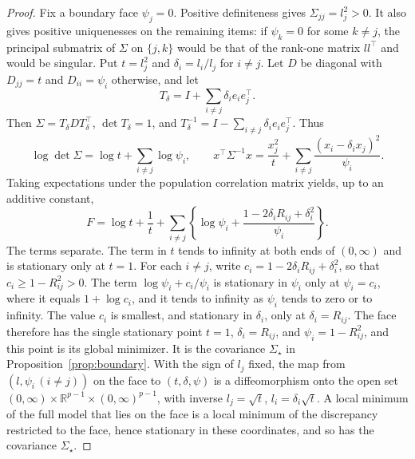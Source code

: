\begin{proof}
Fix a boundary face $\psi_j=0$. Positive definiteness gives $\Sigma_{jj}=l_j^2>0$. It also gives positive uniquenesses on the remaining items: if $\psi_k=0$ for some $k\ne j$, the principal submatrix of $\Sigma$ on $\{j,k\}$ would be that of the rank-one matrix $ll^{\top}$ and would be singular. Put $t=l_j^2$ and $\delta_i=l_i/l_j$ for $i\ne j$. Let $D$ be diagonal with $D_{jj}=t$ and $D_{ii}=\psi_i$ otherwise, and let
\[
T_\delta=I+\sum_{i\ne j}\delta_i e_i e_j^{\top}.
\]
Then $\Sigma=T_\delta DT_\delta^{\top}$, $\det T_\delta=1$, and $T_\delta^{-1}=I-\sum_{i\ne j}\delta_i e_i e_j^{\top}$. Thus
\[
\log\det\Sigma=\log t+\sum_{i\ne j}\log\psi_i,
\qquad
x^{\top}\Sigma^{-1}x
=\frac{x_j^2}{t}+\sum_{i\ne j}\frac{(x_i-\delta_i x_j)^2}{\psi_i}.
\]
Taking expectations under the population correlation matrix yields, up to an additive constant,
\[
F=\log t+\frac1t
+\sum_{i\ne j}\left\{\log\psi_i+
\frac{1-2\delta_iR_{ij}+\delta_i^2}{\psi_i}\right\}.
\]
The terms separate. The term in $t$ tends to infinity at both ends of $(0,\infty)$ and is stationary only at $t=1$. For each $i\ne j$, write $c_i=1-2\delta_iR_{ij}+\delta_i^2$, so that $c_i\ge1-R_{ij}^2>0$. The term $\log\psi_i+c_i/\psi_i$ is stationary in $\psi_i$ only at $\psi_i=c_i$, where it equals $1+\log c_i$, and it tends to infinity as $\psi_i$ tends to zero or to infinity. The value $c_i$ is smallest, and stationary in $\delta_i$, only at $\delta_i=R_{ij}$. The face therefore has the single stationary point $t=1$, $\delta_i=R_{ij}$, and $\psi_i=1-R_{ij}^2$, and this point is its global minimizer. It is the covariance $\Sigma_\star$ in Proposition~\ref{prop:boundary}. With the sign of $l_j$ fixed, the map from $(l,\psi_i\,(i\ne j))$ on the face to $(t,\delta,\psi)$ is a diffeomorphism onto the open set $(0,\infty)\times\mathbb R^{p-1}\times(0,\infty)^{p-1}$, with inverse $l_j=\sqrt t$, $l_i=\delta_i\sqrt t$. A local minimum of the full model that lies on the face is a local minimum of the discrepancy restricted to the face, hence stationary in these coordinates, and so has the covariance $\Sigma_\star$.


\end{proof}
